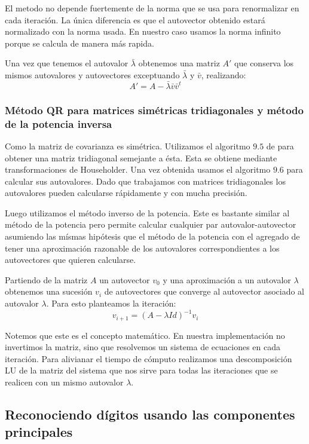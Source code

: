 		El metodo no depende fuertemente de la norma que se usa para renormalizar
		en cada iteraci\'on. La \'unica diferencia es que el autovector obtenido
		estar\'a normalizado con la norma usada. En nuestro caso usamos la norma
		infinito porque se calcula de manera m\'as rapida.

		Una vez que tenemos el autovalor $\bar{\lambda}$ obtenemos una matriz
		$A'$ que conserva los mismos autovalores y autovectores exceptuando
		$\bar{\lambda}$ y $\bar{v}$, realizando:
		$$A' = A-\bar{\lambda}\bar{v}\bar{v}^t$$

	\subsubsection{M\'etodo QR para matrices sim\'etricas tridiagonales y m\'etodo
	de la potencia inversa}

		Como la matriz de covarianza es sim\'etrica. Utilizamos el algoritmo
		$9.5$ de \cite{burden} para obtener una matriz tridiagonal semejante a \'esta.
		Esta se obtiene mediante transformaciones de Householder.
		Una vez obtenida usamos el algoritmo $9.6$ para calcular sus autovalores.
		Dado que trabajamos con matrices tridiagonales los autovalores pueden
		calcularse r\'apidamente y con mucha precisi\'on.

		Luego utilizamos el m\'etodo inverso de la potencia.
		Este es bastante similar al m\'etodo de la potencia pero permite calcular
		cualquier par autovalor-autovector asumiendo las m\'ismas hip\'otesis
		que el m\'etodo de la potencia con el agregado de tener una aproximaci\'on
		razonable de los autovalores correspondientes a los autovectores que
		quieren calcularse.

		Partiendo de la matriz $A$ un autovector $v_0$ y una aproximaci\'on a un
		autovalor $\lambda$ obtenemos una sucesi\'on ${v_i}$ de autovectores
		que converge al autovector asociado al autovalor $\lambda$.
		Para esto planteamos la iteraci\'on:
		$$v_{i+1} = (A-\lambda Id)^{-1}v_i$$

		Notemos que este es el concepto matem\'atico. En nuestra implementaci\'on
		no invertimos la matriz, sino que resolvemos un sistema de ecuaciones
		en cada iteraci\'on. Para alivianar el tiempo de c\'omputo realizamos
		una descomposici\'on LU de la matriz del sistema que nos sirve para
		todas las iteraciones que se realicen con un mismo autovalor $\lambda$.

\subsection{Reconociendo d\'igitos usando las componentes principales}


